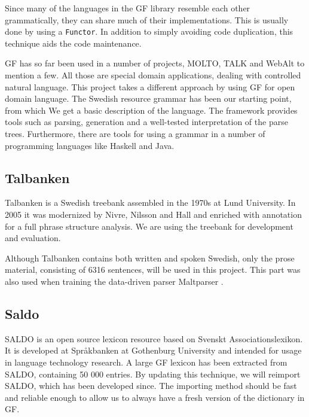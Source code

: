 \documentclass[submission]{eptcs} %
\begin{document}
Since many of the languages in the GF library resemble each other grammatically,
they can share much of their implementations. This is usually done by using a
\verb|Functor|. %
In addition to simply avoiding code duplication, this technique aids the code maintenance.

GF has so far been used in a number of projects, MOLTO\cite{molto}, TALK\cite{talk}
and WebAlt\cite{webalt} to mention a few. 
All those are special domain applications, dealing with controlled natural
language.
This project takes a different approach by using GF for open domain language.
The Swedish resource grammar has been our starting
point, %
from which We get a basic description of the language. The framework provides
tools such as parsing, generation and
a well-tested interpretation of the parse trees. Furthermore, there are tools
for using a grammar in a number of programming languages like Haskell
and Java. 



\subsection{Talbanken}
Talbanken\cite{talbanken} is
a Swedish treebank assembled in the 1970s at Lund University.
In 2005 it was modernized by Nivre, Nilsson and Hall\cite{talbanken05} and
enriched with annotation for a full phrase structure analysis. 
We are using the treebank for development and evaluation. 

Although Talbanken contains both written and spoken Swedish,
only the prose material, consisting of 6316 sentences, will be used in this project.
This part was also used when training the data-driven parser Maltparser \cite{malt}. \\

\subsection{Saldo}
SALDO\cite{saldo} is an open source lexicon resource
based on Svenskt Associationslexikon. It is
developed at Språkbanken at Gothenburg University
and intended for usage in language technology
research. 
A large GF lexicon has been extracted from SALDO,
containing 50 000 entries. By updating this technique, we will
reimport SALDO, which has been developed since.
The importing method should be fast and reliable
enough to allow us to always have a fresh version of the dictionary
in GF.
\end{document}
